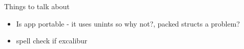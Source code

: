 \documentclass[a4paper, titlepage]{article}
\begin{document}

\listoftodos

\newpage

Things to talk about

\begin{itemize}
	\item Is app portable - it uses unints so why not?, packed structs a problem?
	\item spell check if excalibur
\end{itemize}

\newpage


\newpage

\newpage

\newpage
\tableofcontents
\newpage

\newpage

\newpage

\newpage

\newpage

\newpage

\newpage

\nocite{*}




\newpage

\end{document}
